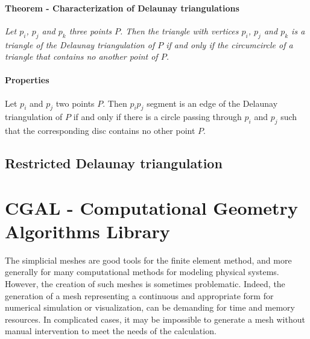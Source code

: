 \paragraph{Theorem - Characterization of Delaunay triangulations}
{
\it Let $p_{i}$, $p_{j}$ and $p_{k}$ three points $P$. Then the triangle with vertices $p_{i}$, $p_{j}$ and $p_{k}$ is a triangle of the Delaunay triangulation of $P$ if and only if the circumcircle of a triangle that contains no another point of $P$.
}

\paragraph{Properties}
{
Let $p_{i}$ and $p_{j}$ two points $P$. Then $p_{i}p_{j}$ segment is an edge of the Delaunay triangulation of $P$ if and only if there is a circle passing through $p_{i}$ and $p_{j}$ such that the corresponding disc contains no other point $P$.
}

\subsection{Restricted Delaunay triangulation}

\section{CGAL - Computational Geometry Algorithms Library}

The simplicial meshes are good tools for the finite element method, and more generally for many computational methods for modeling physical systems. However, the creation of such meshes is sometimes problematic. Indeed, the generation of a mesh representing a continuous and appropriate form for numerical simulation or visualization, can be demanding for time and memory resources. In complicated cases, it may be impossible to generate a mesh without manual intervention to meet the needs of the calculation.\\


